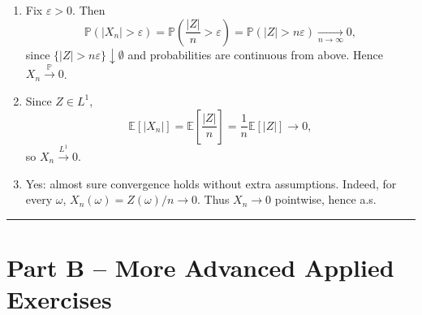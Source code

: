 \documentclass[11pt]{article}
\begin{document}
\begin{enumerate}
\begin{enumerate}
\item Fix $\varepsilon>0$. Then
\[
\mathbb{P}(|X_n|>\varepsilon)=\mathbb{P}\left(\frac{|Z|}{n}>\varepsilon\right)
=\mathbb{P}\left(|Z|>n\varepsilon\right)\xrightarrow[n\to\infty]{}0,
\]
since $\{|Z|>n\varepsilon\}\downarrow \emptyset$ and probabilities are continuous from above.
Hence $X_n\xrightarrow{\mathbb{P}}0$.

\item Since $Z\in L^1$,
\[
\mathbb{E}[|X_n|]=\mathbb{E}\left[\frac{|Z|}{n}\right]=\frac{1}{n}\mathbb{E}[|Z|]\to 0,
\]
so $X_n\xrightarrow{L^1}0$.

\item Yes: almost sure convergence holds without extra assumptions. Indeed, for every $\omega$,
$X_n(\omega)=Z(\omega)/n\to 0$. Thus $X_n\to 0$ pointwise, hence a.s.
\end{enumerate}

\end{enumerate}

\bigskip
\hrule
\bigskip

\section*{Part B -- More Advanced Applied Exercises}
\end{document}

